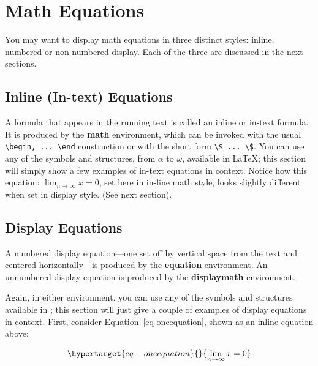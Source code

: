\documentclass[manuscript,screen,review]{acmart}
\begin{document}
\hypertarget{math-equations}{%
\section{Math Equations}\label{math-equations}}

You may want to display math equations in three distinct styles: inline,
numbered or non-numbered display. Each of the three are discussed in the
next sections.

\hypertarget{inline-in-text-equations}{%
\subsection{Inline (In-text) Equations}\label{inline-in-text-equations}}

A formula that appears in the running text is called an inline or
in-text formula. It is produced by the \textbf{math} environment, which
can be invoked with the usual
\texttt{\textbackslash{}begin,\ ...\ \textbackslash{}end} construction
or with the short form
\texttt{\textbackslash{}\$\ ...\ \textbackslash{}\$}. You can use any of
the symbols and structures, from \(\alpha\) to \(\omega\), available in
\LaTeX\citep{Lamport:LaTeX}; this section will simply show a few
examples of in-text equations in context. Notice how this equation:
\(\lim_{n\rightarrow \infty}x=0\), set here in in-line math style, looks
slightly different when set in display style. (See next section).

\hypertarget{display-equations}{%
\subsection{Display Equations}\label{display-equations}}

A numbered display equation---one set off by vertical space from the
text and centered horizontally---is produced by the \textbf{equation}
environment. An unnumbered display equation is produced by the
\textbf{displaymath} environment.

Again, in either environment, you can use any of the symbols and
structures available in \LaTeX@; this section will just give a couple of
examples of display equations in context. First, consider
Equation~\ref{eq-oneequation}, shown as an inline equation above:

\begin{equation}\protect\hypertarget{eq-oneequation}{}{
\lim_{n\rightarrow \infty}x=0
}\label{eq-oneequation}\end{equation}
\end{document}
